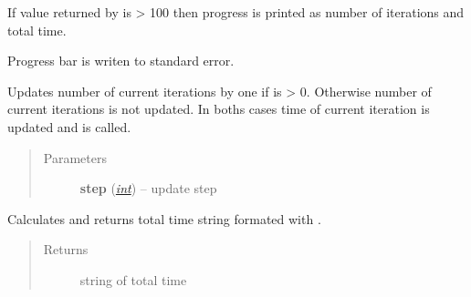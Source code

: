 \documentclass[a4paper,10pt,english]{sphinxmanual}
\begin{document}
\begin{fulllineitems}
\begin{fulllineitems}
If value returned by {\hyperref[aqueduct.utils.log:aqueduct.utils.log.SimpleProgressBar.percent]{}} is \textgreater{} 100 then progress is printed as
number of iterations and total time.

Progress bar is writen to standard error.

\end{fulllineitems}


\begin{fulllineitems}
\label{aqueduct.utils.log:aqueduct.utils.log.SimpleProgressBar.heartbeat}
\end{fulllineitems}


\begin{fulllineitems}
\label{aqueduct.utils.log:aqueduct.utils.log.SimpleProgressBar.update}
Updates number of current iterations  by one if  is \textgreater{} 0.
Otherwise number of current iterations is not updated.
In boths cases time of current iteration  is updated and
{\hyperref[aqueduct.utils.log:aqueduct.utils.log.SimpleProgressBar.show]{}} is called.
\begin{quote}\begin{description}
\item[{Parameters}] \leavevmode
\textbf{step} (\href{http://docs.python.org/2/library/functions.html\#int}{\emph{int}}) -- update step

\end{description}\end{quote}

\end{fulllineitems}


\begin{fulllineitems}
\label{aqueduct.utils.log:aqueduct.utils.log.SimpleProgressBar.ttime}
Calculates and returns total time string formated with {\hyperref[aqueduct.utils.log:aqueduct.utils.log.smart_time_string]{}}.
\begin{quote}\begin{description}
\item[{Returns}] \leavevmode
string of total time


\end{description}
\end{quote}
\end{fulllineitems}
\end{fulllineitems}
\end{document}
